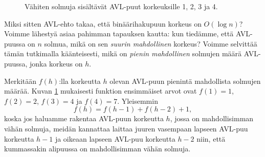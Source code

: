 \begin{figure}
\center
\scriptsize
{}
\caption{Vähiten solmuja sisältävät AVL-puut korkeuksille 1, 2, 3 ja 4.}
\label{fig:avlkor}
\end{figure}

Miksi sitten AVL-ehto takaa, että binäärihakupuun korkeus
on $O(\log n)$?
Voimme lähestyä asiaa pahimman tapauksen kautta:
kun tiedämme, että AVL-puussa on $n$ solmua,
mikä on sen \emph{suurin mahdollinen} korkeus?
Voimme selvittää tämän tutkimalla käänteisesti,
mikä on \emph{pienin mahdollinen} solmujen määrä
AVL-puussa, jonka korkeus on $h$.

Merkitään $f(h)$:lla korkeutta $h$ olevan AVL-puun
pienintä mahdollista solmujen määrää.
Kuvan \ref{fig:avlkor} mukaisesti funktion ensimmäiset arvot
ovat $f(1)=1$, $f(2)=2$, $f(3)=4$ ja $f(4)=7$.
Yleisemmin
\[f(h)=f(h-1)+f(h-2)+1,\]
koska jos haluamme rakentaa AVL-puun korkeutta $h$,
jossa on mahdollisimman vähän solmuja,
meidän kannattaa laittaa juuren vasempaan
lapseen AVL-puu korkeutta $h-1$ ja oikeaan lapseen
AVL-puu korkeutta $h-2$ niin,
että kummassakin alipuussa on mahdollisimman vähän solmuja.


